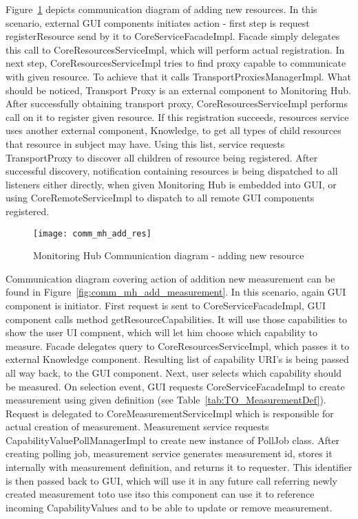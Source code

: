 Figure~\ref{fig:comm_mh_add_res} depicts communication diagram of adding new resources. In this scenario, external GUI
components initiates action - first step is request registerResource send by it to CoreServiceFacadeImpl. Facade simply
delegates this call to CoreResourcesServiceImpl, which will perform actual registration.
In next step, CoreResourcesServiceImpl tries to find proxy capable to communicate with given resource. To achieve that
it calls TransportProxiesManagerImpl. What should be noticed, Transport Proxy is an external component to
Monitoring Hub. After successfully obtaining transport proxy, CoreResourcesServiceImpl performs call on it to
register given resource. If this registration succeeds, resources service uses another external component, Knowledge, to
get all types of child resources that resource in subject may have. Using this list, service requests TransportProxy to
discover all children of resource being registered. After successful discovery, notification containing resources is
being dispatched to all listeners either directly, when given Monitoring Hub is embedded into GUI, or using
CoreRemoteServiceImpl to dispatch to all remote GUI components registered.

\begin{figure}[h]
  \centering
  \texttt{[image: comm\_mh\_add\_res]}
  \caption{Monitoring Hub Communication diagram - adding new resource}
  \label{fig:comm_mh_add_res}
\end{figure}



Communication diagram covering action of addition new measurement can be found in
Figure~\ref{fig:comm_mh_add_measurement}. In this scenario, again GUI component is initiator. First request is
sent to CoreServiceFacadeImpl, GUI component calls method getResourceCapabilities. It will use those capabilities to
show the user UI compnent, which will let him choose which capability to measure. Facade delegates query to
CoreResourcesServiceImpl, which passes it to external Knowledge component. Resulting list of capability URI's is being
passed all way back, to the GUI component. Next, user selects which capability should be measured. On selection event,
GUI requests CoreServiceFacadeImpl to create measurement using given definition (see Table~\ref{tab:TO_MeasurementDef}).
Request is delegated to CoreMeasurementServiceImpl which is responsible for actual creation of measurement. Measurement
service requests CapabilityValuePollManagerImpl to create new instance of PollJob class. After creating polling job,
measurement service generates measurement id, stores it internally with measurement definition, and returns it to
requester. This identifier is then passed back to GUI, which will use it in any future call referring newly created
measurement toto use itso this component can use it to reference incoming CapabilityValues and to be able to update or
remove measurement.

